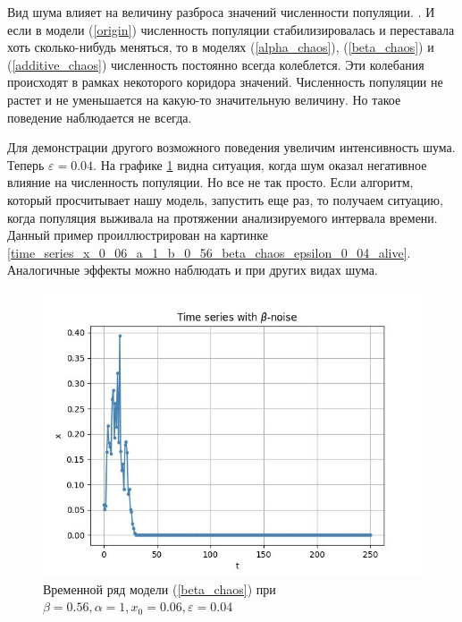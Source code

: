     Вид шума влияет на величину разброса значений численности популяции. . И если в модели (\ref{origin}) численность популяции стабилизировалась и переставала хоть сколько-нибудь меняться, то в моделях (\ref{alpha_chaos}), (\ref{beta_chaos}) и (\ref{additive_chaos}) численность постоянно всегда колеблется. Эти колебания происходят в рамках некоторого коридора значений. Численность популяции не растет и не уменьшается на какую-то значительную величину. Но такое поведение наблюдается не всегда.




    Для демонстрации другого возможного поведения увеличим интенсивность шума. Теперь \(\varepsilon = 0.04\). На графике \ref{time_series_x_0_06_a_1_b_0_56_beta_chaos_epsilon_0_04_fall} видна ситуация, когда шум оказал негативное влияние на численность популяции. Но все не так просто. Если алгоритм, который просчитывает нашу модель, запустить еще раз, то получаем ситуацию, когда популяция выживала на протяжении анализируемого интервала времени. Данный пример проиллюстрирован на картинке \ref{time_series_x_0_06_a_1_b_0_56_beta_chaos_epsilon_0_04_alive}. Аналогичные эффекты можно наблюдать и при других видах шума.


    \begin{figure}
        \centering
        \includegraphics[width=\textwidth]{stochastic/images/time_series_x_0_06_a_1_b_0_56_beta_chaos_epsilon_0_04_fall.jpg}
        
        \captionsetup{justification=centering}
        \caption{Временной ряд модели (\ref{beta_chaos}) при \(\beta = 0.56, \alpha = 1, x_0 = 0.06, \varepsilon = 0.04\)}
        \label{time_series_x_0_06_a_1_b_0_56_beta_chaos_epsilon_0_04_fall}
    \end{figure}

